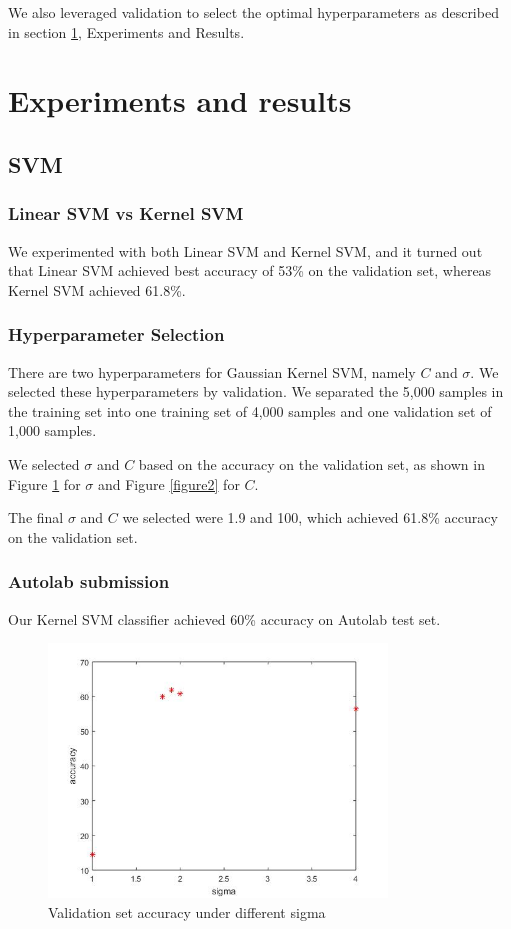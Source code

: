 \documentclass{article} %
\begin{document}
We also leveraged validation to select the optimal hyperparameters as described in section \ref{experiments}, Experiments and Results.
\section{Experiments and results}
\label{experiments}

\subsection{SVM}

\subsubsection{Linear SVM vs Kernel SVM}
We experimented with both Linear SVM and Kernel SVM, and it turned out that Linear SVM achieved best accuracy of 53\% on the validation set, whereas Kernel SVM achieved 61.8\%.

\subsubsection{Hyperparameter Selection}

There are two hyperparameters for Gaussian Kernel SVM, namely $C$ and $\sigma$. We selected these hyperparameters by validation. We separated the 5,000 samples in the training set into one training set of 4,000 samples and one validation set of 1,000 samples.

We selected $\sigma$ and $C$ based on the accuracy on the validation set, as shown in Figure \ref{figure1} for $\sigma$ and Figure \ref{figure2} for $C$. 

The final $\sigma$ and $C$ we selected were 1.9 and 100, which achieved 61.8\% accuracy on the validation set.

\subsubsection{Autolab submission}
Our Kernel SVM classifier achieved 60\% accuracy on Autolab test set.

\begin{figure}[ht!]
	\centering
	\includegraphics[width=90mm]{sigma.jpg}
	\caption{Validation set accuracy under different sigma\label{figure1}}
\end{figure}
\end{document}
